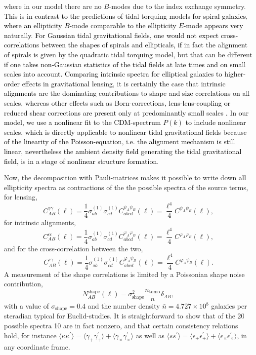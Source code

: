 \documentclass[a4paper,fleqn,usenatbib]{mnras}
\newcommand\spirou[1]{\textcolor{black}{#1}}
\newcommand{\bra}{\langle}
\newcommand{\ket}{\rangle}
\begin{document}
where in our model there are no $B$-modes due to the index exchange symmetry. \spirou{This is in contrast to the predictions of tidal torquing models for spiral galaxies, where an ellipticity $B$-mode comparable to the ellipticity $E$-mode appears very naturally. For Gaussian tidal gravitational fields, one would not expect cross-correlations between the shapes of spirals and ellipticals, if in fact the alignment of spirals is given by the quadratic tidal torquing model, but that can be different if one takes non-Gaussian statistics of the tidal fields at late times and on small scales into account. Comparing intrinsic spectra for elliptical galaxies to higher-order effects in gravitational lensing, it is certainly the case that intrinsic alignments are the dominating contributions to shape and size correlations on all scales, whereas other effects such as Born-corrections, lens-lens-coupling or reduced shear corrections are present only at predominantly small scales \citep{krause_weak_2010}. In our model, we use a nonlinear fit to the CDM-spectrum $P(k)$ to include nonlinear scales, which is directly applicable to nonlinear tidal gravitational fields because of the linearity of the Poisson-equation, i.e. the alignment mechanism is still linear, nevertheless the ambient density field generating the tidal gravitational field, is in a stage of nonlinear structure formation.}

Now, the decomposition with Pauli-matrices makes it possible to write down all ellipticity spectra as contractions of the the possible spectra of the source terms, for lensing,
\begin{equation}
C^{\gamma\gamma}_{AB}(\ell) = \frac{1}{4}\sigma^{(1)}_{ab}\sigma^{(1)}_{cd}C^{\psi_A\psi_B}_{abcd}(\ell) = \frac{\ell^4}{4}C^{\psi_A\psi_B}(\ell),
\end{equation}
for intrinsic alignments,
\begin{equation}
C^{\epsilon\epsilon}_{AB}(\ell) = \frac{1}{4}\sigma^{(1)}_{ab}\sigma^{(1)}_{cd}C^{\varphi_A\varphi_B}_{abcd}(\ell) = \frac{\ell^4}{4}C^{\varphi_A\varphi_B}(\ell),
\end{equation}
and for the cross-correlation between the two,
\begin{equation}
C^{\epsilon\gamma}_{AB}(\ell) = \frac{1}{4}\sigma^{(1)}_{ab}\sigma^{(1)}_{cd}C^{\varphi_A\psi_B}_{abcd}(\ell) = \frac{\ell^4}{4}C^{\varphi_A\psi_B}(\ell).
\end{equation}
A measurement of the shape correlations is limited by a Poissonian shape noise contribution,
\begin{equation}
N_{AB}^\mathrm{shape}(\ell) = \sigma^2_\mathrm{shape}\frac{n_\mathrm{tomo}}{\bar{n}}\delta_{AB},
\end{equation}
with a value of $\sigma_\mathrm{shape} = 0.4$ and the number density $\bar{n} = 4.727\times 10^8$ galaxies per steradian typical for Euclid-studies. It is straightforward to show that of the 20 possible spectra 10 are in fact nonzero, and that certain consistency relations hold, for instance $\bra\kappa\kappa^\prime\ket = \bra\gamma_+\gamma_+^\prime\ket + \bra\gamma_\times\gamma_\times^\prime\ket$ as well as $\bra ss^\prime\ket = \bra\epsilon_+\epsilon_+^\prime\ket + \bra\epsilon_\times\epsilon_\times^\prime\ket$, in any coordinate frame.
\end{document}
